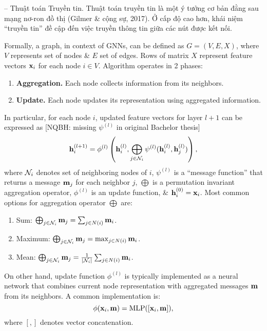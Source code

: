 \documentclass{article}
\begin{document}
\begin{itemize}
\begin{itemize}
        -- {\sf Thuật toán Truyền tin.} Thuật toán truyền tin là một ý tưởng cơ bản đằng sau mạng nơ-ron đồ thị (Gilmer \& cộng sự, 2017). Ở cấp độ cao hơn, khái niệm ``truyền tin'' đề cập đến việc truyền thông tin giữa các nút được kết nối.

        Formally, a graph, in context of GNNs, can be defined as $G = (V,E,X)$, where $V$ represents set of nodes \& $E$ set of edges. Rows of matrix $X$ represent feature vectors ${\bf x}_i$ for each node $i\in V$. Algorithm operates in 2 phases:
        \begin{enumerate}
            \item {\bf Aggregation.} Each node collects information from its neighbors.
            \item {\bf Update.} Each node updates its representation using aggregated information.
        \end{enumerate}
        In particular, for each node $i$, updated feature vectors for layer $l + 1$ can be expressed as [NQBH: missing $\psi^{(l)}$ in original Bachelor thesis]
        \begin{equation*}
            {\bf h}_i^{(l + 1)} = \phi^{(l)}\left({\bf h}_i^{(l)},\bigoplus_{j\in{\cal N}_i} \psi^{(l)}({\bf h}_i^{(l)},{\bf h}_j^{(l)})\right),
        \end{equation*}
        where ${\cal N}_i$ denotes set of neighboring nodes of $i$, $\psi^{(l)}$ is a ``message function'' that returns a message ${\bf m}_j$ for each neighbor $j$, $\bigoplus$ is a permutation invariant aggregation operator, $\phi^{(l)}$ is an update function, \& ${\bf h}_i^{(0)} = {\bf x}_i$. Most common options for aggregation operator $\bigoplus$ are:
        \begin{enumerate}
            \item Sum: $\bigoplus_{j\in{\cal N}_i} {\bf m}_j = \sum_{j\in N(i)} {\bf m}_i$.
            \item Maximum: $\bigoplus_{j\in{\cal N}_i} {\bf m}_j = \max_{j\in N(i)} {\bf m}_i$.
            \item Mean: $\bigoplus_{j\in{\cal N}_i} {\bf m}_j = \frac{1}{|{\cal N}_i|}\sum_{j\in N(i)} {\bf m}_i$.
        \end{enumerate}
        On other hand, update function $\phi^{(l)}$ is typically implemented as a neural network that combines current node representation with aggregated messages ${\bf m}$ from its neighbors. A common implementation is:
        \begin{equation*}
            \phi({\bf x}_i,{\bf m}) = {\rm MLP}([{\bf x}_i,{\bf m}]),
        \end{equation*}
        where $[,]$ denotes vector concatenation.


\end{itemize}
\end{itemize}
\end{document}
